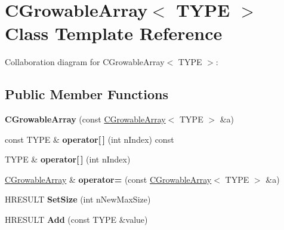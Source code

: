 \hypertarget{class_c_growable_array}{\section{C\+Growable\+Array$<$ T\+Y\+P\+E $>$ Class Template Reference}
\label{class_c_growable_array}
}


Collaboration diagram for C\+Growable\+Array$<$ T\+Y\+P\+E $>$\+:
\subsection*{Public Member Functions}
\begin{DoxyCompactItemize}
\item 
\hypertarget{class_c_growable_array_a1182f9c2f07df66d2a91933a5cf96940}{{\bfseries C\+Growable\+Array} (const \hyperlink{class_c_growable_array}{C\+Growable\+Array}$<$ T\+Y\+P\+E $>$ \&a)}\label{class_c_growable_array_a1182f9c2f07df66d2a91933a5cf96940}

\item 
\hypertarget{class_c_growable_array_a8250879c57e65000a7ac62644432e292}{const T\+Y\+P\+E \& {\bfseries operator\mbox{[}$\,$\mbox{]}} (int n\+Index) const }\label{class_c_growable_array_a8250879c57e65000a7ac62644432e292}

\item 
\hypertarget{class_c_growable_array_a03c07cc22ff5856f83633a58f37e64b9}{T\+Y\+P\+E \& {\bfseries operator\mbox{[}$\,$\mbox{]}} (int n\+Index)}\label{class_c_growable_array_a03c07cc22ff5856f83633a58f37e64b9}

\item 
\hypertarget{class_c_growable_array_add2653ca7201a0500ba21d4783990552}{\hyperlink{class_c_growable_array}{C\+Growable\+Array} \& {\bfseries operator=} (const \hyperlink{class_c_growable_array}{C\+Growable\+Array}$<$ T\+Y\+P\+E $>$ \&a)}\label{class_c_growable_array_add2653ca7201a0500ba21d4783990552}

\item 
\hypertarget{class_c_growable_array_a4a4ebbbb825519349a1cb07a8002975a}{H\+R\+E\+S\+U\+L\+T {\bfseries Set\+Size} (int n\+New\+Max\+Size)}\label{class_c_growable_array_a4a4ebbbb825519349a1cb07a8002975a}

\item 
\hypertarget{class_c_growable_array_a63527f5abc32e76867278928eee2e32b}{H\+R\+E\+S\+U\+L\+T {\bfseries Add} (const T\+Y\+P\+E \&value)}\label{class_c_growable_array_a63527f5abc32e76867278928eee2e32b}


\end{DoxyCompactItemize}
